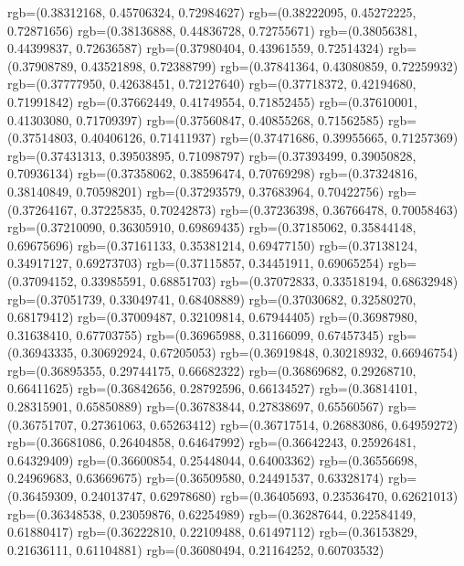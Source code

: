 {{        rgb=(0.38312168, 0.45706324, 0.72984627)
        rgb=(0.38222095, 0.45272225, 0.72871656)
        rgb=(0.38136888, 0.44836728, 0.72755671)
        rgb=(0.38056381, 0.44399837, 0.72636587)
        rgb=(0.37980404, 0.43961559, 0.72514324)
        rgb=(0.37908789, 0.43521898, 0.72388799)
        rgb=(0.37841364, 0.43080859, 0.72259932)
        rgb=(0.37777950, 0.42638451, 0.72127640)
        rgb=(0.37718372, 0.42194680, 0.71991842)
        rgb=(0.37662449, 0.41749554, 0.71852455)
        rgb=(0.37610001, 0.41303080, 0.71709397)
        rgb=(0.37560847, 0.40855268, 0.71562585)
        rgb=(0.37514803, 0.40406126, 0.71411937)
        rgb=(0.37471686, 0.39955665, 0.71257369)
        rgb=(0.37431313, 0.39503895, 0.71098797)
        rgb=(0.37393499, 0.39050828, 0.70936134)
        rgb=(0.37358062, 0.38596474, 0.70769298)
        rgb=(0.37324816, 0.38140849, 0.70598201)
        rgb=(0.37293579, 0.37683964, 0.70422756)
        rgb=(0.37264167, 0.37225835, 0.70242873)
        rgb=(0.37236398, 0.36766478, 0.70058463)
        rgb=(0.37210090, 0.36305910, 0.69869435)
        rgb=(0.37185062, 0.35844148, 0.69675696)
        rgb=(0.37161133, 0.35381214, 0.69477150)
        rgb=(0.37138124, 0.34917127, 0.69273703)
        rgb=(0.37115857, 0.34451911, 0.69065254)
        rgb=(0.37094152, 0.33985591, 0.68851703)
        rgb=(0.37072833, 0.33518194, 0.68632948)
        rgb=(0.37051739, 0.33049741, 0.68408889)
        rgb=(0.37030682, 0.32580270, 0.68179412)
        rgb=(0.37009487, 0.32109814, 0.67944405)
        rgb=(0.36987980, 0.31638410, 0.67703755)
        rgb=(0.36965988, 0.31166099, 0.67457345)
        rgb=(0.36943335, 0.30692924, 0.67205053)
        rgb=(0.36919848, 0.30218932, 0.66946754)
        rgb=(0.36895355, 0.29744175, 0.66682322)
        rgb=(0.36869682, 0.29268710, 0.66411625)
        rgb=(0.36842656, 0.28792596, 0.66134527)
        rgb=(0.36814101, 0.28315901, 0.65850889)
        rgb=(0.36783844, 0.27838697, 0.65560567)
        rgb=(0.36751707, 0.27361063, 0.65263412)
        rgb=(0.36717514, 0.26883086, 0.64959272)
        rgb=(0.36681086, 0.26404858, 0.64647992)
        rgb=(0.36642243, 0.25926481, 0.64329409)
        rgb=(0.36600854, 0.25448044, 0.64003362)
        rgb=(0.36556698, 0.24969683, 0.63669675)
        rgb=(0.36509580, 0.24491537, 0.63328174)
        rgb=(0.36459309, 0.24013747, 0.62978680)
        rgb=(0.36405693, 0.23536470, 0.62621013)
        rgb=(0.36348538, 0.23059876, 0.62254989)
        rgb=(0.36287644, 0.22584149, 0.61880417)
        rgb=(0.36222810, 0.22109488, 0.61497112)
        rgb=(0.36153829, 0.21636111, 0.61104881)
        rgb=(0.36080494, 0.21164252, 0.60703532)
}}
